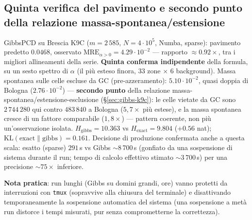 \documentclass[11pt,a4paper]{article}
\newcommand{\code}[1]{\texttt{#1}}
\begin{document}
\subsection{Quinta verifica del pavimento e secondo punto della
relazione massa-spontanea/estensione}
GibbsPCD su Brescia K9C ($m=2\,585$, $N=4\cdot10^5$, Numba, sparse):
pavimento predetto $0.0468$, osservato $\text{MRE}_{\alpha>0}=4.29
\cdot10^{-2}$ --- rapporto $\approx0.92\times$, tra i migliori
allineamenti della serie. \textbf{Quinta conferma indipendente} della
formula, su un sesto spettro di $\alpha$ (il pi\`u esteso finora, $33$
zone $\times$ $6$ background). Massa spontanea sulle celle escluse da
GC (pre-azzeramento): $5.10\cdot10^{-2}$, quasi doppia di Bologna
($2.76\cdot10^{-2}$) --- \textbf{secondo punto} della relazione
massa-spontanea/estensione-esclusione (\S\ref{sec:gibbs-k9c}): le celle
vietate da GC sono $2\,744\,280$ qui contro $483\,840$ a Bologna
($5{,}7\times$ pi\`u estese), e la massa spontanea cresce di un fattore
comparabile ($1{,}8\times$) --- pattern coerente, non pi\`u
un'osservazione isolata. $H_{\text{gibbs}}=10.363$ vs
$H_{\text{exact}}=9.804$ ($+0.56$ nat);
$\mathrm{KL}(\text{exact}\|\text{gibbs})=0.161$. Decisione di produzione
confermata anche a questa scala: esatto (sparse) $291$\,s vs Gibbs
$\sim$8\,700\,s (gonfiato da una sospensione di sistema durante il run;
tempo di calcolo effettivo stimato $\sim$3\,700\,s) per una precisione
$\sim75\times$ inferiore.

\medskip\noindent\textbf{Nota pratica}: run lunghi (Gibbs su domini
grandi, ore) vanno protetti da interruzioni con \code{tmux} (sopravvive
alla chiusura del terminale) e disattivando temporaneamente la
sospensione automatica del sistema (una sospensione a met\`a run
distorce i tempi misurati, pur senza comprometterne la correttezza).

\end{document}
